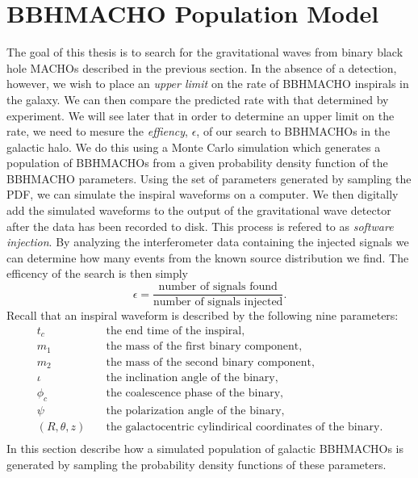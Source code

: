 \section{BBHMACHO Population Model}
\label{s:bbhmachopopulation}

The goal of this thesis is to search for the gravitational waves from binary
black hole MACHOs described in the previous section. In the absence of a
detection, however, we wish to place an \emph{upper limit} on the rate of
BBHMACHO inspirals in the galaxy. We can then compare the predicted rate
with that determined by experiment. We will see later that in order to
determine an upper limit on the rate, we need to mesure the \emph{effiency},
$\epsilon$, of our search to BBHMACHOs in the galactic halo. We do this
using a Monte Carlo simulation which generates a population of BBHMACHOs from
a given probability density function of the BBHMACHO parameters. Using the
set of parameters generated by sampling the PDF, we can simulate the inspiral
waveforms on a computer. We then digitally add the simulated waveforms to the
output of the gravitational wave detector after the data has been recorded to
disk. This process is refered to as \emph{software injection}. By analyzing
the interferometer data containing the injected signals we can determine how
many events from the known source distribution we find. The efficency of the
search is then simply
\begin{equation}
\epsilon = 
\frac{\textrm{number of signals found}}{\textrm{number of signals injected}}.
\end{equation}
Recall that an inspiral waveform is described by the following nine 
parameters:
\begin{equation*}
\begin{split}
t_c &\quad \textrm{the end time of the inspiral}, \\
m_1 &\quad \textrm{the mass of the first binary component}, \\
m_2 &\quad \textrm{the mass of the second binary component}, \\
\iota &\quad \textrm{the inclination angle of the binary}, \\
\phi_c &\quad \textrm{the coalescence phase of the binary}, \\
\psi &\quad \textrm{the polarization angle of the binary}, \\
(R,\theta,z) &\quad \textrm{the galactocentric cylindirical coordinates of the
binary}.\\
\end{split}
\end{equation*}
In this section describe how a simulated population of galactic BBHMACHOs is
generated by sampling the probability density functions of these parameters.

